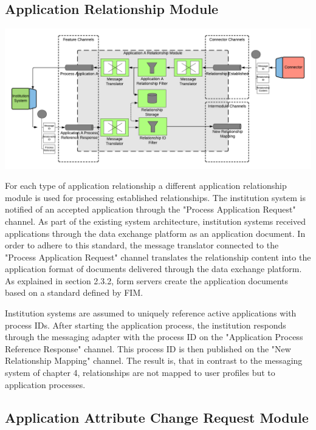 \subsection{Application Relationship Module}

\begin{center}
    \includegraphics[scale=0.5]{Diagrams/Integration Architecture 2/Technological Integration/6. Application Relationship Module.pdf}
\end{center}

For each type of application relationship a different application relationship module is used for processing established relationships. The institution system is notified of an accepted application through the "Process Application Request" channel. As part of the existing system architecture, institution systems received applications through the data exchange platform as an application document. In order to adhere to this standard, the message translator connected to the "Process Application Request" channel translates the relationship content into the application format of documents delivered through the data exchange platform. As explained in section 2.3.2, form servers create the application documents based on a standard defined by FIM.

Institution systems are assumed to uniquely reference active applications with process IDs. After starting the application process, the institution responds through the messaging adapter with the process ID on the "Application Process Reference Response" channel. This process ID is then published on the "New Relationship Mapping" channel. The result is, that in contrast to the messaging system of chapter 4, relationships are not mapped to user profiles but to application processes.

\subsection{Application Attribute Change Request Module}

